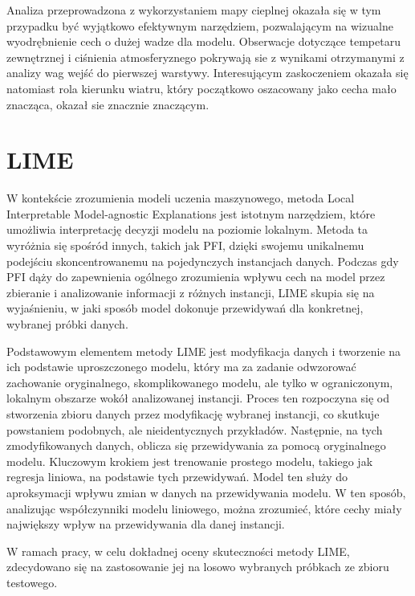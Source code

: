 \documentclass[a4paper,twoside,12pt]{book}
\begin{document}
Analiza przeprowadzona z wykorzystaniem mapy cieplnej okazała się w tym przypadku być wyjątkowo efektywnym narzędziem, pozwalającym na wizualne wyodrębnienie cech o dużej wadze dla modelu. Obserwacje dotyczące tempetaru zewnętrznej i ciśnienia atmosferyznego pokrywają sie z wynikami otrzymanymi z analizy wag wejść do pierwszej warstywy. Interesującym zaskoczeniem okazała się natomiast rola kierunku wiatru, który początkowo oszacowany jako cecha mało znacząca, okazał sie znacznie znaczącym.

\newpage
\section{LIME}
W kontekście zrozumienia modeli uczenia maszynowego, metoda Local Interpretable Model-agnostic Explanations jest istotnym narzędziem, które umożliwia interpretację decyzji modelu na poziomie lokalnym. Metoda ta wyróżnia się spośród innych, takich jak PFI, dzięki swojemu unikalnemu podejściu skoncentrowanemu na pojedynczych instancjach danych. Podczas gdy PFI dąży do zapewnienia ogólnego zrozumienia wpływu cech na model przez zbieranie i analizowanie informacji z różnych instancji, LIME skupia się na wyjaśnieniu, w jaki sposób model dokonuje przewidywań dla konkretnej, wybranej próbki danych.

Podstawowym elementem metody LIME jest modyfikacja danych i tworzenie na ich podstawie uproszczonego modelu, który ma za zadanie odwzorować zachowanie oryginalnego, skomplikowanego modelu, ale tylko w ograniczonym, lokalnym obszarze wokół analizowanej instancji. Proces ten rozpoczyna się od stworzenia zbioru danych przez modyfikację wybranej instancji, co skutkuje powstaniem podobnych, ale nieidentycznych przykładów. Następnie, na tych zmodyfikowanych danych, oblicza się przewidywania za pomocą oryginalnego modelu. Kluczowym krokiem jest trenowanie prostego modelu, takiego jak regresja liniowa, na podstawie tych przewidywań. Model ten służy do aproksymacji wpływu zmian w danych na przewidywania modelu. W ten sposób, analizując współczynniki modelu liniowego, można zrozumieć, które cechy miały największy wpływ na przewidywania dla danej instancji.

W ramach pracy, w celu dokładnej oceny skuteczności metody LIME, zdecydowano się na zastosowanie jej na losowo wybranych próbkach ze zbioru testowego.
\end{document}
